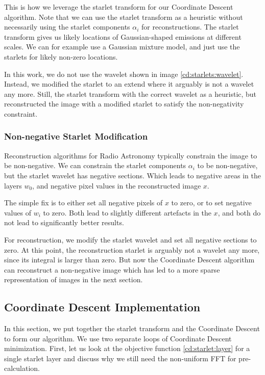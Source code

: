 This is how we  leverage the starlet transform for our Coordinate Descent algorithm. Note that we can use the starlet transform as a heuristic without necessarily using the starlet components $\alpha_i$ for reconstructions. The starlet transform gives us likely locations of Gaussian-shaped emissions at different scales. We can for example use a Gaussian mixture model, and just use the starlets for likely non-zero locations. 

In this work, we do not use the wavelet shown in image \ref{cd:starlets:wavelet}. Instead, we modified the starlet to an extend where it arguably is not a wavelet any more. Still, the starlet transform with the correct wavelet as a heuristic, but reconstructed the image with a modified starlet to satisfy the non-negativity constraint. 


\subsubsection{Non-negative Starlet Modification}
Reconstruction algorithms for Radio Astronomy typically constrain the image to be non-negative\cite{mcewen2011compressed}. We can constrain the starlet components $\alpha_i$ to be non-negative, but the starlet wavelet has negative sections. Which leads to negative areas in the layers $w_0$, and negative pixel values in the reconstructed image $x$.

The simple fix is to either set all negative pixels of $x$ to zero, or to set negative values of $w_i$ to zero. Both lead to slightly different artefacts in the $x$, and both do not lead to significantly better results.

For reconstruction, we modify the starlet wavelet and set all negative sections to zero. At this point, the reconstruction starlet is arguably not a wavelet any more, since its integral is larger than zero. But now the Coordinate Descent algorithm can reconstruct a non-negative image which has led to a more sparse representation of images in the next section.



\subsection{Coordinate Descent Implementation}
In this section, we put together the starlet transform and the Coordinate Descent to form our algorithm. We use two separate loops of Coordinate Descent minimization. First, let us look at the objective function \eqref{cd:starlet:layer} for a single starlet layer and discuss why we still need the non-uniform FFT for pre-calculation. 

